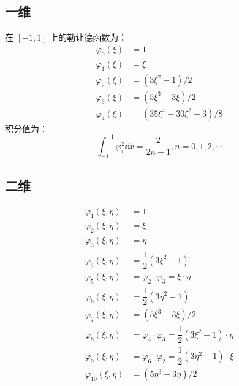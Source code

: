 \documentclass{article}
\numberwithin{equation}{subsection}    %
\begin{document}
\begin{appendix}
    \subsection{一维}
    在 $[-1,1]$ 上的勒让德函数为：
    \begin{equation}
        \begin{aligned}
            \varphi_{0}(\xi) & =1                                        \\
            \varphi_{1}(\xi) & =\xi                                      \\
            \varphi_{2}(\xi) & =\left(3 \xi^{2}-1\right) / 2             \\
            \varphi_{3}(\xi) & =\left(5 \xi^{3}-3 \xi\right) / 2         \\
            \varphi_{4}(\xi) & =\left(35 \xi^{4}-30 \xi^{2}+3\right) / 8
        \end{aligned}
    \end{equation}
    积分值为：
    \begin{equation}
        \int_{-1}^{-1}\varphi_i^2\dd x=\frac{2}{2n+1},n=0,1,2,\cdots
    \end{equation}

    \subsection{二维}
    \begin{equation}
        \begin{aligned}
            \varphi_{1}(\xi, \eta)  & =1                                                                             \\
            \varphi_{2}(\xi, \eta)  & =\xi                                                                           \\
            \varphi_{3}(\xi, \eta)  & =\eta                                                                          \\
            \varphi_{4}(\xi, \eta)  & =\dfrac{1}{2}\left(3 \xi^{2}-1\right)                                          \\
            \varphi_{5}(\xi, \eta)  & =\varphi_{2} \cdot \varphi_{3}=\xi \cdot \eta                                  \\
            \varphi_{6}(\xi, \eta)  & =\dfrac{1}{2}\left(3 \eta^{2}-1\right)                                         \\
            \varphi_{7}(\xi, \eta)  & =\left(5 \xi^{3}-3 \xi\right) / 2                                              \\
            \varphi_{8}(\xi, \eta)  & =\varphi_{4} \cdot \varphi_{3}=\dfrac{1}{2}\left(3 \xi^{2}-1\right) \cdot \eta \\
            \varphi_{9}(\xi, \eta)  & =\varphi_{6} \cdot \varphi_{2}=\dfrac{1}{2}\left(3 \eta^{2}-1\right) \cdot \xi \\
            \varphi_{10}(\xi, \eta) & =\left(5 \eta^{3}-3 \eta\right) / 2
        \end{aligned}
    \end{equation}

\end{appendix}
\end{document}
